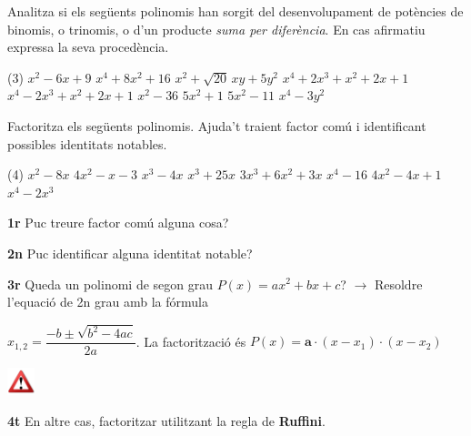 \begin{mylist}
 
\exer  Analitza si els següents polinomis han sorgit del desenvolupament de potències de binomis, o trinomis, o d'un producte \textit{suma per diferència}. En cas afirmatiu expressa la seva procedència. 
 \begin{tasks}(3)  
 \task $x^{2} -6x+9$  \task $x^{4} +8x^{2} +16$  \task $x^{2} +\sqrt{20} \, xy+5y^{2} $ \task $x^{4} +2x^{3} +x^{2} +2x+1$
\task $x^{4} -2x^{3} +x^{2} +2x+1$  \task $x^{2} -36$  \task $5x^{2} +1$   \task $5x^{2} -11$ \task $x^{4} -3y^{2} $
\end{tasks}

\exer  Factoritza els següents polinomis. Ajuda't traient factor comú i identificant possibles identitats notables.
\begin{tasks}(4)
	\task $x^{2} -8x$  	
	\task $4x^{2} -x-3$  
	\task $x^{3} -4x$  	
	\task $x^{3} +25x$
	\task $3x^3+6x^2+3x$
	\task $x^4 - 16$
	\task $4x^2 - 4x +1$
	\task $x^4 - 2x^3$
\end{tasks}
\answers[cols=1]{[$x(x-8)$, $(4x+3)(x-1)$, $x(x+2)(x-2)$, $x(x^2+25)$, $3x(x+1)^2$, $(x+2)(x-2)(x^2+4)$, $(2x-1)^2$, $x^3(x-2)$]}

\end{mylist}

\begin{theorybox}
	
	
	\textbf{1r} Puc treure factor comú alguna cosa?
	
	\textbf{2n} Puc identificar alguna identitat notable?
	
	\textbf{3r} Queda un polinomi de segon grau $P(x)=ax^2+bx+c$? $\rightarrow$ Resoldre l'equació de 2n grau amb la fórmula
	\begin{center}
	$x_{1,2}=\dfrac{-b\pm\sqrt{b^2-4ac}}{2a}$. La factorització és $P(x)=\mathbf{a}\cdot (x-x_1)\cdot (x-x_2)$ 

	 \includegraphics[width=0.8cm]{img-02/warning}	
	\end{center}
	
	\textbf{4t} En altre cas, factoritzar utilitzant la regla de \textbf{Ruffini}.
\end{theorybox}


